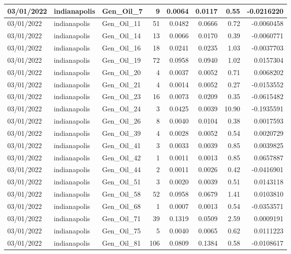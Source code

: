 \documentclass[
  letterpaper,
  DIV=11,
  numbers=noendperiod]{scrartcl}
\begin{document}
\begin{tabular}{l|l|l|r|r|r|r|r}
\hline
03/01/2022 & indianapolis & Gen\_Oil\_7 & 9 & 0.0064 & 0.0117 & 0.55 & -0.0216220\\
\hline
03/01/2022 & indianapolis & Gen\_Oil\_11 & 51 & 0.0482 & 0.0666 & 0.72 & -0.0060458\\
\hline
03/01/2022 & indianapolis & Gen\_Oil\_14 & 13 & 0.0066 & 0.0170 & 0.39 & -0.0060771\\
\hline
03/01/2022 & indianapolis & Gen\_Oil\_16 & 18 & 0.0241 & 0.0235 & 1.03 & -0.0037703\\
\hline
03/01/2022 & indianapolis & Gen\_Oil\_19 & 72 & 0.0958 & 0.0940 & 1.02 & 0.0157304\\
\hline
03/01/2022 & indianapolis & Gen\_Oil\_20 & 4 & 0.0037 & 0.0052 & 0.71 & 0.0068202\\
\hline
03/01/2022 & indianapolis & Gen\_Oil\_21 & 4 & 0.0014 & 0.0052 & 0.27 & -0.0153552\\
\hline
03/01/2022 & indianapolis & Gen\_Oil\_23 & 16 & 0.0073 & 0.0209 & 0.35 & -0.0615482\\
\hline
03/01/2022 & indianapolis & Gen\_Oil\_24 & 3 & 0.0425 & 0.0039 & 10.90 & -0.1935591\\
\hline
03/01/2022 & indianapolis & Gen\_Oil\_26 & 8 & 0.0040 & 0.0104 & 0.38 & 0.0017593\\
\hline
03/01/2022 & indianapolis & Gen\_Oil\_39 & 4 & 0.0028 & 0.0052 & 0.54 & 0.0020729\\
\hline
03/01/2022 & indianapolis & Gen\_Oil\_41 & 3 & 0.0033 & 0.0039 & 0.85 & 0.0039825\\
\hline
03/01/2022 & indianapolis & Gen\_Oil\_42 & 1 & 0.0011 & 0.0013 & 0.85 & 0.0657887\\
\hline
03/01/2022 & indianapolis & Gen\_Oil\_44 & 2 & 0.0011 & 0.0026 & 0.42 & -0.0416901\\
\hline
03/01/2022 & indianapolis & Gen\_Oil\_51 & 3 & 0.0020 & 0.0039 & 0.51 & 0.0143118\\
\hline
03/01/2022 & indianapolis & Gen\_Oil\_58 & 52 & 0.0958 & 0.0679 & 1.41 & 0.0103810\\
\hline
03/01/2022 & indianapolis & Gen\_Oil\_68 & 1 & 0.0007 & 0.0013 & 0.54 & -0.0353571\\
\hline
03/01/2022 & indianapolis & Gen\_Oil\_71 & 39 & 0.1319 & 0.0509 & 2.59 & 0.0009191\\
\hline
03/01/2022 & indianapolis & Gen\_Oil\_75 & 5 & 0.0040 & 0.0065 & 0.62 & 0.0111223\\
\hline
03/01/2022 & indianapolis & Gen\_Oil\_81 & 106 & 0.0809 & 0.1384 & 0.58 & -0.0108617\\

\end{tabular}
\end{document}
